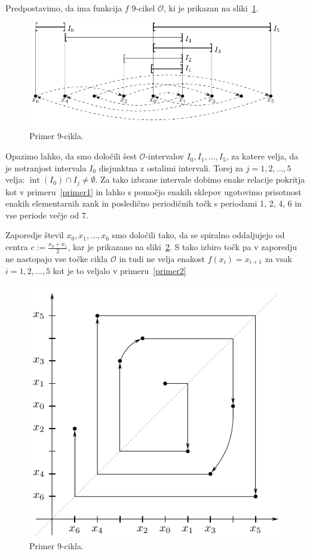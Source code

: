\documentclass[mat2]{fmfdelo}
\DeclareMathOperator{\interior}{int}
\begin{document}
\begin{primer}[9-cikel] \label{primer3}
Predpostavimo, da ima funkcija $f$ 9-cikel $\mathcal{O}$, ki je prikazan na sliki~\ref{fig:9cikel}. 
\begin{figure}[h]
  \centering
  \includegraphics{images/devetcikel.pdf}
  \caption[Primer vektorske slike.]{Primer 9-cikla.}
  \label{fig:9cikel}
\end{figure}
Opazimo lahko, da smo določili šest $\mathcal{O}$-intervalov $I_0, I_1, \dots, I_5$, za katere velja, da je notranjost intervala $I_0$ disjunktna z ostalimi intervali. Torej za $j=1, 2, \dots, 5$ velja: $\interior{(I_0)} \cap I_j \neq \emptyset$. Za tako izbrane intervale dobimo enake relacije pokritja kot v primeru~\ref{primer1} in lahko s pomočjo enakih sklepov ugotovimo prisotnost enakih elementarnih zank in posledično periodičnih točk s periodami 1, 2, 4, 6 in vse periode večje od 7.

Zaporedje števil $x_0, x_1, \dots, x_6$ smo določili tako, da se spiralno oddaljujejo od centra $c:=\frac{x_0+x_1}{2}$, kar je prikazano na sliki~\ref{fig:spiral}. S tako izbiro točk pa v zaporedju ne nastopajo vse točke cikla $\mathcal{O}$ in tudi ne velja enakost $f(x_i) = x_{i+1}$ za vsak $i = 1, 2, \dots, 5$ kot je to veljalo v primeru~\ref{primer2}
\begin{figure}[h]
  \centering
  \includegraphics{images/spiral.pdf}
  \caption[Primer vektorske slike.]{Primer 9-cikla.}
  \label{fig:spiral}
\end{figure}


\end{primer}
\end{document}

